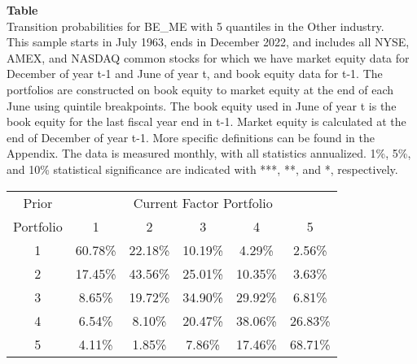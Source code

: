 \begin{table*}[ht!]
\raggedright
{}
\label{tab: transition_probs_BE_ME_Other_with_5_quantiles}
\textbf{Table \thetable} \\
Transition probabilities for BE_ME with 5 quantiles in the Other industry. \\
\hspace*{1em}This sample starts in July 1963, ends in December 2022, and includes all NYSE, AMEX, and NASDAQ common stocks for which we have market equity data for December of year t-1 and June of year t, and book equity data for t-1. The portfolios are constructed on book equity to market equity at the end of each June using quintile breakpoints.  The book equity used in June of year t is the book equity for the last fiscal year end in t-1.  Market equity is calculated at the end of December of year t-1.  More specific definitions can be found in the Appendix.  The data is measured monthly, with all statistics annualized.  1\%, 5\%, and 10\% statistical significance are indicated with ***, **, and *, respectively. \\
\vspace{0.5em}
\centering
\begin{adjustbox}{max width=\textwidth}
\begin{tabular}{@{}cccccc@{}}
\toprule
Prior & \multicolumn{5}{c}{Current Factor Portfolio} \\
Portfolio & 1 & 2 & 3 & 4 & 5 \\
\midrule
1 & 60.78\% & 22.18\% & 10.19\% & 4.29\% & 2.56\% \\
2 & 17.45\% & 43.56\% & 25.01\% & 10.35\% & 3.63\% \\
3 & 8.65\% & 19.72\% & 34.90\% & 29.92\% & 6.81\% \\
4 & 6.54\% & 8.10\% & 20.47\% & 38.06\% & 26.83\% \\
5 & 4.11\% & 1.85\% & 7.86\% & 17.46\% & 68.71\% \\
\bottomrule
\end{tabular}
\end{adjustbox}
\end{table*}